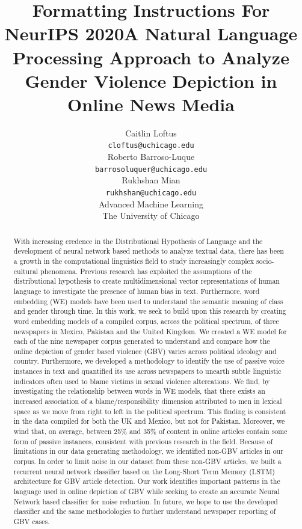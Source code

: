 \documentclass{article}
\title{Formatting Instructions For NeurIPS 2020}
\title{A Natural Language Processing Approach to Analyze Gender Violence Depiction in Online News Media}
\author{Caitlin Loftus \\
	\texttt{cloftus@uchicago.edu}  \\
	\AND
	Roberto Barroso-Luque\\
	\texttt{barrosoluquer@uchicago.edu} \\
	\AND
	Rukhshan Mian\\
	\texttt{rukhshan@uchicago.edu} \\
	\AND
	Advanced Machine Learning\\
	The University of Chicago
}
\begin{document}
\maketitle

\begin{abstract}{

With increasing credence in the Distributional Hypothesis of Language and the development of neural network based methods to analyze textual data, there has been a growth in the computational linguistics field to study increasingly complex socio-cultural phenomena. Previous research has exploited the assumptions of the distributional hypothesis to create multidimensional vector representations of human language to investigate the presence of human bias in text. Furthermore,  word embedding (WE) models
have been used to understand the semantic meaning of class and gender through time. In this work, we seek to build upon this research by creating word embedding models of a compiled corpus, across the political spectrum, of three newspapers in Mexico, Pakistan and the United Kingdom. We created a WE model for each of the nine newspaper corpus generated to understand and compare how the online depiction of gender based violence (GBV) varies across political ideology and country. Furthermore, we developed a methodology to identify the use of passive voice instances in text and quantified its use across newspapers to unearth subtle linguistic indicators often used to blame victims in sexual violence altercations. We find, by investigating the relationship between words in WE models, that there exists an increased association of a blame/responsibility dimension attributed to men in lexical space as we move from right to left in the political spectrum. This finding is consistent in the data compiled for both the UK and Mexico, but not for Pakistan. Moreover, we wind that, on average, between 25\% and 35\% of content in online articles contain some form of passive instances, consistent with previous research in the field. Because of limitations in our data generating methodology, we identified non-GBV articles in our corpus. In order to limit noise in our dataset from these non-GBV articles, we built a recurrent neural network classifier based on the Long-Short Term Memory (LSTM) architecture for GBV article detection. Our work identifies important patterns in the language used in online depiction of GBV while seeking to create an accurate Neural Network based classifier for noise reduction. In future, we hope to use the developed classifier and the same methodologies to further understand newspaper reporting of GBV cases.


	}
\end{abstract}
\end{document}
